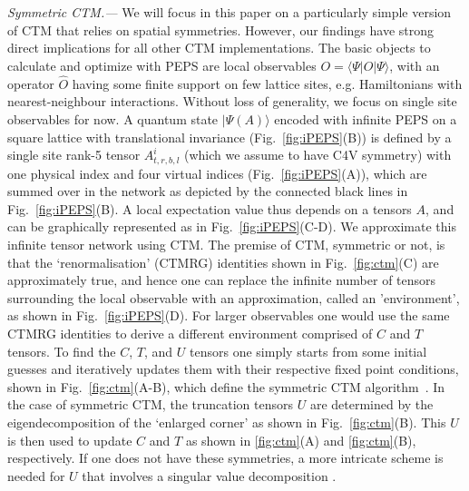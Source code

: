 \documentclass[twocolumn,floatfix,superscriptaddress,longbibliography,pra]{revtex4-2}
\newcommand{\ket}[1]{\vert #1 \rangle}
\newcommand{\bra}[1]{\langle #1 \vert}
\renewcommand{\section}[1]{\emph{#1.---}}
\begin{document}
\section{Symmetric CTM}%
We will focus in this paper on a particularly simple version of CTM that relies on spatial symmetries. However, our findings have strong direct implications for all other CTM implementations.
The basic objects to calculate and optimize with PEPS are local observables $O=\bra{\Psi}\hat{O}\ket{\Psi}$, with an operator $\hat{O}$ having some finite support on few lattice sites, e.g. Hamiltonians with nearest-neighbour interactions. Without loss of generality, we focus on single site observables for now. A quantum state $\vert\Psi(A)\rangle$ encoded with infinite PEPS on a square lattice with translational invariance (Fig.~\ref{fig:iPEPS}(B)) is defined by a single site rank-5 tensor $A^i_{t,r,b,l}$ (which we assume to have C4V symmetry) with one physical index and four virtual indices (Fig.~\ref{fig:iPEPS}(A)), which are summed over in the network as depicted by the connected black lines in Fig.~\ref{fig:iPEPS}(B). A local expectation value thus depends on a tensors $A$, and can be graphically represented as in Fig.~\ref{fig:iPEPS}(C-D). We approximate this infinite tensor network using CTM. The premise of CTM, symmetric or not,  is that the `renormalisation' (CTMRG) identities shown in Fig.~\ref{fig:ctm}(C) are approximately true, and hence one can replace the infinite number of tensors surrounding the local observable with an approximation, called an 'environment', as shown in Fig.~\ref{fig:iPEPS}(D). For larger observables one would use the same CTMRG identities to derive a different environment comprised of $C$ and $T$ tensors. To find the $C$, $T$, and $U$ tensors one simply starts from some initial guesses and iteratively updates them with their respective fixed point conditions, shown in Fig.~\ref{fig:ctm}(A-B), which define the symmetric CTM algorithm~\cite{CTMRG}. In the case of symmetric CTM, the truncation tensors $U$ are determined by the eigendecomposition of the `enlarged corner' as shown in Fig.~\ref{fig:ctm}(B). This $U$ is then used to update $C$ and $T$ as shown in \ref{fig:ctm}(A) and \ref{fig:ctm}(B), respectively. If one does not have these symmetries, a more intricate scheme is needed for $U$ that involves a singular value decomposition \cite{vPEPS_tJ}.
\end{document}

